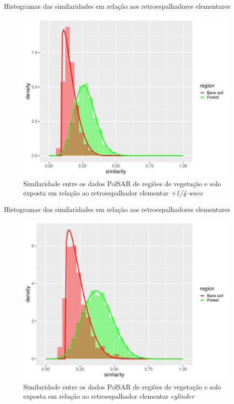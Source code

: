 \documentclass{beamer} %
\begin{document}
\begin{frame}{Histogramas das similaridades em relação aos retroespalhadores elementares}

\begin{figure}
    \centering
    \includegraphics[width = .6\linewidth]{wvp.pdf}
    \caption{Similaridade entre os dados PolSAR de regiões de vegetação e solo exposta em relação ao retroespalhador elementar \textit{+1/4-wave}}
    \label{fig:wvp}
\end{figure}
    
\end{frame}

\begin{frame}{Histogramas das similaridades em relação aos retroespalhadores elementares}

\begin{figure}
    \centering
    \includegraphics[width = .6\linewidth]{cy.pdf}
    \caption{Similaridade entre os dados PolSAR de regiões de vegetação e solo exposta em relação ao retroespalhador elementar \textit{cylinder}}
    \label{fig:cy}
\end{figure}
    
\end{frame}
\end{document}
